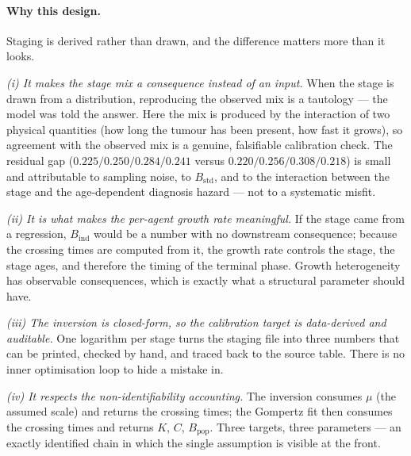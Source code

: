 \documentclass[12pt,a4paper]{article}
\newcommand{\why}[1]{\paragraph{Why this design.} #1}
\begin{document}
\why{Staging is derived rather than drawn, and the difference matters more than it looks.

\emph{(i) It makes the stage mix a consequence instead of an input.} When the stage is drawn from a
distribution, reproducing the observed mix is a tautology --- the model was told the answer. Here the mix
is produced by the interaction of two physical quantities (how long the tumour has been present, how fast
it grows), so agreement with the observed mix is a genuine, falsifiable calibration check. The residual
gap ($0.225/0.250/0.284/0.241$ versus $0.220/0.256/0.308/0.218$) is small and attributable to sampling
noise, to $B_{\text{std}}$, and to the interaction between the stage and the age-dependent diagnosis
hazard --- not to a systematic misfit.

\emph{(ii) It is what makes the per-agent growth rate meaningful.} If the stage came from a regression,
$B_{\text{ind}}$ would be a number with no downstream consequence; because the crossing times are computed
from it, the growth rate controls the stage, the stage ages, and therefore the timing of the terminal
phase. Growth heterogeneity has observable consequences, which is exactly what a structural parameter
should have.

\emph{(iii) The inversion is closed-form, so the calibration target is data-derived and auditable.} One
logarithm per stage turns the staging file into three numbers that can be printed, checked by hand, and
traced back to the source table. There is no inner optimisation loop to hide a mistake in.

\emph{(iv) It respects the non-identifiability accounting.} The inversion consumes $\mu$ (the assumed
scale) and returns the crossing times; the Gompertz fit then consumes the crossing times and returns
$K$, $C$, $B_{\text{pop}}$. Three targets, three parameters --- an exactly identified chain in which the
single assumption is visible at the front.}
\end{document}
